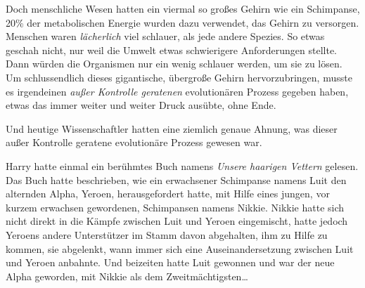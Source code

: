 Doch menschliche Wesen hatten ein viermal so großes Gehirn wie ein Schimpanse, 20\% der metabolischen Energie wurden dazu verwendet, das Gehirn zu versorgen. Menschen waren \emph{lächerlich} viel schlauer, als jede andere Spezies. So etwas geschah nicht, nur weil die Umwelt etwas schwierigere Anforderungen stellte. Dann würden die Organismen nur ein wenig schlauer werden, um sie zu lösen. Um schlussendlich dieses gigantische, übergroße Gehirn hervorzubringen, musste es irgendeinen \emph{außer Kontrolle geratenen} evolutionären Prozess gegeben haben, etwas das immer weiter und weiter Druck ausübte, ohne Ende.

Und heutige Wissenschaftler hatten eine ziemlich genaue Ahnung, was dieser außer Kontrolle geratene evolutionäre Prozess gewesen war.

Harry hatte einmal ein berühmtes Buch namens \emph{Unsere haarigen Vettern} gelesen.
Das Buch hatte beschrieben, wie ein erwachsener Schimpanse namens Luit den alternden Alpha, Yeroen, herausgefordert hatte, mit Hilfe eines jungen, vor kurzem erwachsen gewordenen, Schimpansen namens Nikkie. Nikkie hatte sich nicht direkt in die Kämpfe zwischen Luit und Yeroen eingemischt, hatte jedoch Yeroens andere Unterstützer im Stamm davon abgehalten, ihm zu Hilfe zu kommen, sie abgelenkt, wann immer sich eine Auseinandersetzung zwischen Luit und Yeroen anbahnte. Und beizeiten hatte Luit gewonnen und war der neue Alpha geworden, mit Nikkie als dem Zweitmächtigsten…

